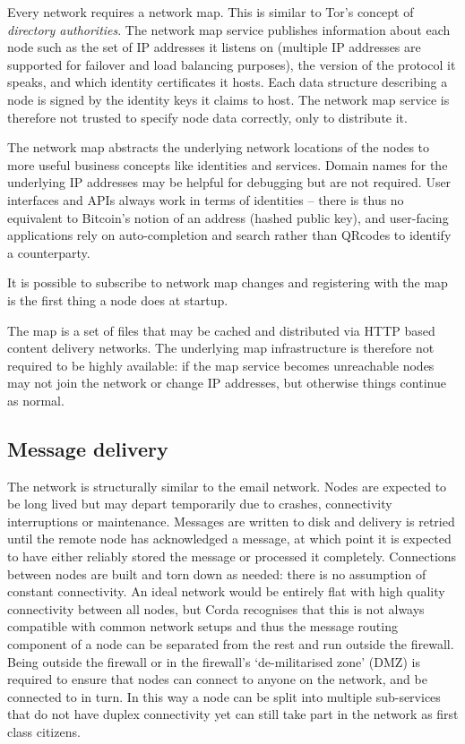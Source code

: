 \documentclass{article}
\begin{document}
Every network requires a network map. This is similar to Tor's concept of \emph{directory authorities}. The network
map service publishes information about each node such as the set of IP addresses it listens on (multiple IP
addresses are supported for failover and load balancing purposes), the version of the protocol it speaks, and which
identity certificates it hosts. Each data structure describing a node is signed by the identity keys it claims to
host. The network map service is therefore not trusted to specify node data correctly, only to distribute it.

The network map abstracts the underlying network locations of the nodes to more useful business concepts like
identities and services. Domain names for the underlying IP addresses may be helpful for debugging but are not
required. User interfaces and APIs always work in terms of identities -- there is thus no equivalent to Bitcoin's
notion of an address (hashed public key), and user-facing applications rely on auto-completion and search rather
than QRcodes to identify a counterparty.

It is possible to subscribe to network map changes and registering with the map is the first thing a node does at
startup.

The map is a set of files that may be cached and distributed via HTTP based content delivery networks. The
underlying map infrastructure is therefore not required to be highly available: if the map service becomes
unreachable nodes may not join the network or change IP addresses, but otherwise things continue as normal.

\subsection{Message delivery}

The network is structurally similar to the email network. Nodes are expected to be long lived but may depart
temporarily due to crashes, connectivity interruptions or maintenance. Messages are written to disk and delivery is
retried until the remote node has acknowledged a message, at which point it is expected to have either reliably
stored the message or processed it completely. Connections between nodes are built and torn down as needed: there
is no assumption of constant connectivity. An ideal network would be entirely flat with high quality connectivity
between all nodes, but Corda recognises that this is not always compatible with common network setups and thus the
message routing component of a node can be separated from the rest and run outside the firewall. Being outside the
firewall or in the firewall's `de-militarised zone' (DMZ) is required to ensure that nodes can connect to anyone on
the network, and be connected to in turn. In this way a node can be split into multiple sub-services that do not
have duplex connectivity yet can still take part in the network as first class citizens.
\end{document}
